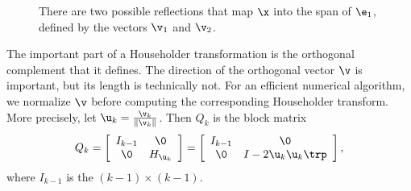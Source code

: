 \begin{figure}[H] %
\caption{There are two possible reflections that map $\x$ into the span of $\e_1$, defined by the vectors $\v_1$ and $\v_2$.}
\label{fig:householder-two-possible-reflectors}
\end{figure}


The important part of a Householder transformation is the orthogonal complement that it defines.
The direction of the orthogonal vector $\v$ is important, but its length is technically not.
For an efficient numerical algorithm, we normalize $\v$ before computing the corresponding Householder transform.
More precisely, let $\u_k = \frac{\v_k}{\|\v_k\|}$.
Then $Q_k$ is the block matrix
%
\begin{equation*}
Q_k =
\left[\begin{array}{cc}
I_{k-1}  & \0 \\
\0 & H_{\u_k} \\
\end{array}\right] =
\left[\begin{array}{cc}
I_{k-1}  & \0 \\
\0 & I - 2 \u_k\u_k\trp \\
\end{array}\right],
\end{equation*}
where $I_{k-1}$ is the $(k-1) \times (k-1)$.

